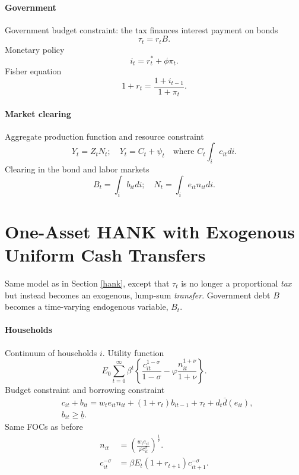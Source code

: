 \documentclass[11pt,a4paper]{article}
\begin{document}
\paragraph{Government}
Government budget constraint: the tax finances interest payment on bonds
\begin{equation*}
\tau_t=r_tB.
\end{equation*}
Monetary policy
\begin{equation*}
i_t=r_t^*+\phi\pi_t.
\end{equation*}
Fisher equation
\begin{equation*}
1+r_t=\frac{1+i_{t-1}}{1+\pi_t}.
\end{equation*}


\paragraph{Market clearing} Aggregate production function and resource constraint
\begin{equation*}
Y_t=Z_tN_t;\quad Y_t=C_t+\psi_t\quad\text{where }C_t\int_i c_{it}di.
\end{equation*}
Clearing in the bond and labor markets
\begin{equation*}
B_t=\int_ib_{it}di;\quad N_t=\int_ie_{it}n_{it}di.
\end{equation*}




\section{One-Asset HANK with Exogenous Uniform Cash Transfers}
\label{hanktransfer}
Same model as in Section \ref{hank}, except that $\tau_t$ is no longer a proportional \textit{tax} but instead becomes an exogenous, lump-sum \textit{transfer}. Government debt $B$ becomes a time-varying endogenous variable, $B_t$.


\paragraph{Households}
Continuum of households $i$. Utility function
\begin{equation*}
E_0\sum_{t=0}^{\infty}\beta^t\left\{\frac{c_{it}^{1-\sigma}}{1-\sigma}-\varphi\frac{n_{it}^{1+\nu}}{1+\nu}\right\}.
\end{equation*}
Budget constraint and borrowing constraint
\begin{align*}
&c_{it}+b_{it}=w_te_{it}n_{it}+(1+r_t)b_{it-1}+\tau_t+d_t\bar{d}(e_{it}),\\
&b_{it}\geq\underline{b}.
\end{align*}
Same FOCs as before
\begin{align*}
n_{it}&=\left(\frac{w_te_{it}}{\varphi c_{it}^{\sigma}}\right)^{\frac{1}{\nu}}.\\
c_{it}^{-\sigma}&=\beta E_t(1+r_{t+1})c_{it+1}^{-\sigma}.
\end{align*}
\end{document}
